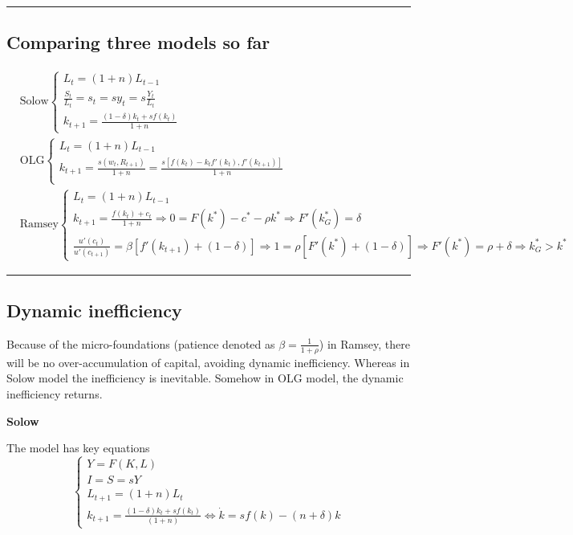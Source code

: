 \documentclass{article}
\newcommand*\sepline{%
  \begin{center}
    \rule[1ex]{.5\textwidth}{.5pt}
  \end{center}}
\begin{document}
\sepline
\subsection{Comparing three models so far}
\begin{align}
&\text{Solow}
\begin{cases} L_{t}=(1+n)L_{t-1} \\
\frac{S_{t}}{L_{t}}=s_{t} =sy_{t}=s \frac{Y_{t}}{L_{t}} \\
k_{t+1}=\frac{(1-\delta)k_{t}+s f(k_{t})}{1+n}
\end{cases}
\\&\text{OLG} \begin{cases}
L_{t}=(1+n)L_{t-1} \\
k_{t+1}=\frac{s(w_{t},R_{t+1})}{1+n}=\frac{s[f(k_{t})-k_{t}f'(k_{t}),f'(k_{t+1})]}{1+n} \\
\end{cases}
\\&\text{Ramsey} \begin{cases}L_{t}=(1+n)L_{t-1} \\
k_{t+1}=\frac{f(k_{t})+c_{t}}{1+n} \Rightarrow 0=F(k^{*})-c^{*}-\rho k^{*} \Rightarrow F'(k^{*}_{G})=\delta\\
\frac{u'(c_{t})}{u'(c_{t+1})}=\beta[f'(k_{t+1})+(1-\delta)]\Rightarrow 1= \rho [F'(k^{*})+(1-\delta)] \Rightarrow F'(k^{*})=\rho +\delta \Rightarrow k^{*}_{G}>k^{*}
\end{cases}
\end{align}

\sepline
\subsection{Dynamic inefficiency}
Because of the micro-foundations (patience denoted as $\beta=\frac{1}{1+\rho}$) in Ramsey, there will be no over-accumulation of capital, avoiding dynamic inefficiency. Whereas in Solow model the inefficiency is inevitable. Somehow in OLG model, the dynamic inefficiency returns.

\textbf{Solow}

The model has key equations
\begin{equation}
\begin{cases}
  Y=F(K,L)
  \\
  I=S=sY
  \\
  L_{t+1}=(1+n)L_t
  \\
  k_{t+1}=\frac{(1-\delta)k_t+sf(k_t)}{(1+n)}\iff \dot k=sf(k)-(n+\delta)k
\end{cases}
\end{equation}
\end{document}
